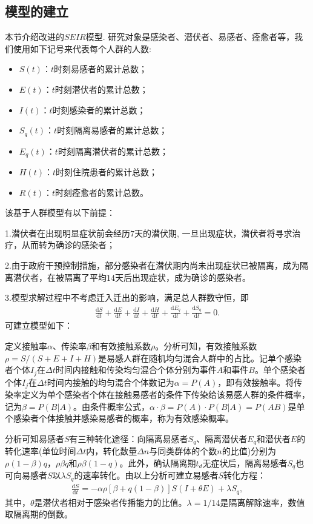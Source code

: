 \documentclass{whutmod}
\begin{document}
		\subsection{模型的建立}
			本节介绍改进的$SEIR$模型. 研究对象是感染者、潜伏者、易感者、痊愈者等，我们使用如下记号来代表每个人群的人数:
			\begin{itemize}
				\item $S(t)$：$t$时刻易感者的累计总数；
				\item $E(t)$：$t$时刻潜伏者的累计总数；
				\item $I(t)$：$t$时刻感染者的累计总数；
				\item $S_q(t)$：$t$时刻隔离易感者的累计总数；
				\item $E_q(t)$：$t$时刻隔离潜伏者的累计总数；
				\item $H(t)$：$t$时刻住院患者的累计总数；
				\item $R(t)$：$t$时刻痊愈者的累计总数。
			\end{itemize}
		
			该基于人群模型有以下前提：

			1.潜伏者在出现明显症状前会经历$7$天的潜伏期, 一旦出现症状，潜伏者将寻求治疗，从而转为确诊的感染者；
			
			2.由于政府干预控制措施，部分感染者在潜伏期内尚未出现症状已被隔离，成为隔离潜伏者，在被隔离了平均$14$天后出现症状，成为确诊的感染者。
			
			3.模型求解过程中不考虑迁入迁出的影响，满足总人群数守恒，即
			\begin{gather}
			\frac{\mathrm{d} S}{\mathrm{d} t}+\frac{\mathrm{d} E}{\mathrm{d} t}+\frac{\mathrm{d} I}{\mathrm{d} t}+\frac{\mathrm{d} H}{\mathrm{d} t}+\frac{\mathrm{d} E_q}{\mathrm{d} t}+\frac{\mathrm{d} S_q}{\mathrm{d} t}=0.
			\end{gather}
			可建立模型如下：
			
			定义接触率$\alpha$、传染率$\beta$和有效接触系数$\rho$。分析可知，有效接触系数$\rho=S/(S+E+I+H)$是易感人群在随机均匀混合人群中的占比。记单个感染者个体$I_j$在$\Delta t$时间内接触和传染均匀混合个体分别为事件$A$和事件$B$。单个感染者个体$I_j$在$\Delta t$时间内接触的均匀混合个体数记为$\alpha=P(A)$，即有效接触率。将传染率定义为单个感染者个体在接触易感者的条件下传染给该易感人群的条件概率，记为$\beta=P(B|A)$。由条件概率公式，$\alpha \cdot \beta=P(A)\cdot P(B|A)=P(AB)$是单个感染者个体接触并感染易感者的概率，称为有效感染概率。
			
			分析可知易感者$S$有三种转化途径：向隔离易感者$S_q$、隔离潜伏者$E_q$和潜伏者$E$的转化速率(单位时间$\Delta t$内，转化数量$\Delta n$与同类群体的个数$n$的比值)分别为$\rho (1-\beta)q$，$ \rho \beta q$和$\rho \beta(1-q)$。此外，确认隔离期$t_d$无症状后，隔离易感者$S_q$也可向易感者$S$以$\lambda S_{q}$的速率转化。由以上分析可建立易感者$S$转化方程：
			\begin{gather}
			\frac{\mathrm{d} S}{\mathrm{d} t}=-\alpha\rho [\beta +q(1-\beta)]S(I+\theta E)+\lambda S_{q},
			\end{gather}
			其中，$\theta$是潜伏者相对于感染者传播能力的比值。$\lambda=1/14$是隔离解除速率，数值取隔离期的倒数。
		
\end{document}
